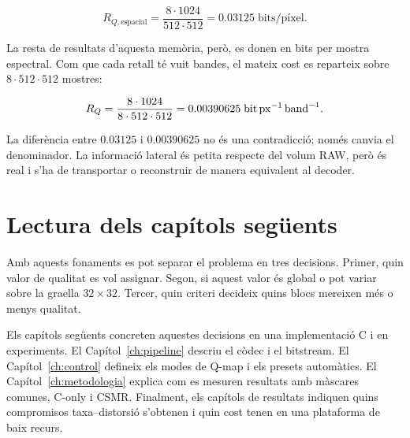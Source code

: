 \begin{equation}
R_{Q,\mathrm{espacial}}=
\frac{8\cdot1024}{512\cdot512}
=0.03125\;\text{bits/píxel}.
\label{eq:qmap_side_spatial_bps}
\end{equation}

La resta de resultats d'aquesta memòria, però, es donen en bits per mostra
espectral. Com que cada retall té vuit bandes, el mateix cost es reparteix sobre
$8\cdot512\cdot512$ mostres:

\begin{equation}
R_Q=
\frac{8\cdot1024}{8\cdot512\cdot512}
=0.00390625\;\mathrm{bit}\,\mathrm{px}^{-1}\,\mathrm{band}^{-1}.
\label{eq:qmap_side_bps}
\end{equation}

La diferència entre $0.03125$ i $0.00390625$ no és una contradicció; només
canvia el denominador. La informació lateral és petita respecte del volum RAW,
però és real i s'ha de transportar o reconstruir de manera equivalent al
decoder.

\section{Lectura dels capítols següents}\label{sec:criteris_lectura}

Amb aquests fonaments es pot separar el problema en tres decisions. Primer,
quin valor de qualitat es vol assignar. Segon, si aquest valor és global o pot
variar sobre la graella $32\times32$. Tercer, quin criteri decideix quins blocs
mereixen més o menys qualitat.

Els capítols següents concreten aquestes decisions en una implementació C i en
experiments. El Capítol~\ref{ch:pipeline} descriu el còdec i el bitstream. El
Capítol~\ref{ch:control} defineix els modes de Q-map i els presets automàtics.
El Capítol~\ref{ch:metodologia} explica com es mesuren resultats amb màscares
comunes, C-only i CSMR. Finalment, els capítols de resultats indiquen quins
compromisos taxa--distorsió s'obtenen i quin cost tenen en una plataforma de
baix recurs.
